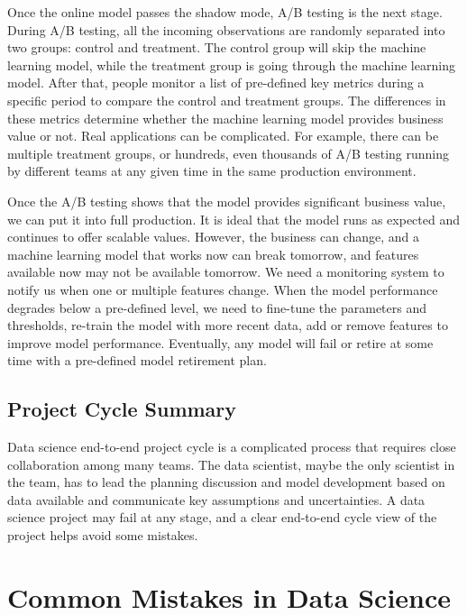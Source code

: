 \documentclass[12pt,]{krantz}
\begin{document}
Once the online model passes the shadow mode, A/B testing is the next stage. During A/B testing, all the incoming observations are randomly separated into two groups: control and treatment. The control group will skip the machine learning model, while the treatment group is going through the machine learning model. After that, people monitor a list of pre-defined key metrics during a specific period to compare the control and treatment groups. The differences in these metrics determine whether the machine learning model provides business value or not. Real applications can be complicated. For example, there can be multiple treatment groups, or hundreds, even thousands of A/B testing running by different teams at any given time in the same production environment.

Once the A/B testing shows that the model provides significant business value, we can put it into full production. It is ideal that the model runs as expected and continues to offer scalable values. However, the business can change, and a machine learning model that works now can break tomorrow, and features available now may not be available tomorrow. We need a monitoring system to notify us when one or multiple features change. When the model performance degrades below a pre-defined level, we need to fine-tune the parameters and thresholds, re-train the model with more recent data, add or remove features to improve model performance. Eventually, any model will fail or retire at some time with a pre-defined model retirement plan.

\hypertarget{project-cycle-summary}{%
\subsection{Project Cycle Summary}\label{project-cycle-summary}}

Data science end-to-end project cycle is a complicated process that requires close collaboration among many teams. The data scientist, maybe the only scientist in the team, has to lead the planning discussion and model development based on data available and communicate key assumptions and uncertainties. A data science project may fail at any stage, and a clear end-to-end cycle view of the project helps avoid some mistakes.

\hypertarget{common-mistakes-in-data-science}{%
\section{Common Mistakes in Data Science}\label{common-mistakes-in-data-science}}
\end{document}
